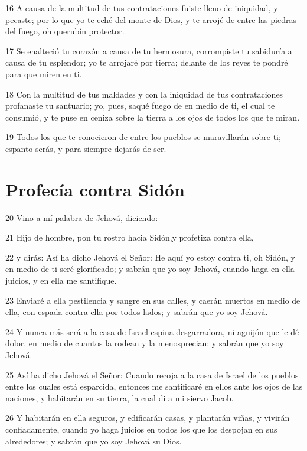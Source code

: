 \par 16 A causa de la multitud de tus contrataciones fuiste lleno de iniquidad, y pecaste; por lo que yo te eché del monte de Dios, y te arrojé de entre las piedras del fuego, oh querubín protector.
\par 17 Se enalteció tu corazón a causa de tu hermosura, corrompiste tu sabiduría a causa de tu esplendor; yo te arrojaré por tierra; delante de los reyes te pondré para que miren en ti.
\par 18 Con la multitud de tus maldades y con la iniquidad de tus contrataciones profanaste tu santuario; yo, pues, saqué fuego de en medio de ti, el cual te consumió, y te puse en ceniza sobre la tierra a los ojos de todos los que te miran.
\par 19 Todos los que te conocieron de entre los pueblos se maravillarán sobre ti; espanto serás, y para siempre dejarás de ser. 

\section*{Profecía contra Sidón}

\par 20 Vino a mí palabra de Jehová, diciendo:
\par 21 Hijo de hombre, pon tu rostro hacia Sidón,y profetiza contra ella,
\par 22 y dirás: Así ha dicho Jehová el Señor: He aquí yo estoy contra ti, oh Sidón, y en medio de ti seré glorificado; y sabrán que yo soy Jehová, cuando haga en ella juicios, y en ella me santifique.
\par 23 Enviaré a ella pestilencia y sangre en sus calles, y caerán muertos en medio de ella, con espada contra ella por todos lados; y sabrán que yo soy Jehová.
\par 24 Y nunca más será a la casa de Israel espina desgarradora, ni aguijón que le dé dolor, en medio de cuantos la rodean y la menosprecian; y sabrán que yo soy Jehová.
\par 25 Así ha dicho Jehová el Señor: Cuando recoja a la casa de Israel de los pueblos entre los cuales está esparcida, entonces me santificaré en ellos ante los ojos de las naciones, y habitarán en su tierra, la cual di a mi siervo Jacob.
\par 26 Y habitarán en ella seguros, y edificarán casas, y plantarán viñas, y vivirán confiadamente, cuando yo haga juicios en todos los que los despojan en sus alrededores; y sabrán que yo soy Jehová su Dios.

